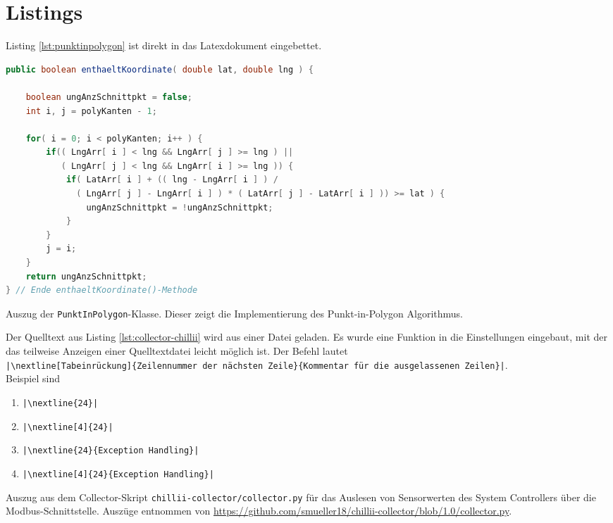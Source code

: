 \section{Listings}
\label{sec:listings}

Listing \ref{lst:punktinpolygon} ist direkt in das Latexdokument eingebettet.
\begin{code}
  \begin{lstlisting}[firstnumber=11,language=java]
public boolean enthaeltKoordinate( double lat, double lng ) {

    boolean ungAnzSchnittpkt = false;
    int i, j = polyKanten - 1;

    for( i = 0; i < polyKanten; i++ ) {
        if(( LngArr[ i ] < lng && LngArr[ j ] >= lng ) ||
           ( LngArr[ j ] < lng && LngArr[ i ] >= lng )) {
            if( LatArr[ i ] + (( lng - LngArr[ i ] ) /
              ( LngArr[ j ] - LngArr[ i ] ) * ( LatArr[ j ] - LatArr[ i ] )) >= lat ) {
                ungAnzSchnittpkt = !ungAnzSchnittpkt;
            }
        }
        j = i;
    }
    return ungAnzSchnittpkt;
} // Ende enthaeltKoordinate()-Methode
  \end{lstlisting}
  \caption[Auszug der PunktInPolygon-Klasse]{Auszug der \texttt{PunktInPolygon}-Klasse. Dieser zeigt die Implementierung des Punkt-in-Polygon Algorithmus.}
  \label{lst:punktinpolygon}
\end{code}


Der Quelltext aus Listing \ref{lst:collector-chillii} wird aus einer Datei geladen. Es wurde eine Funktion in die Einstellungen eingebaut, mit der das teilweise Anzeigen einer Quelltextdatei leicht möglich ist. Der Befehl lautet\\
\texttt{\scriptsize |\textbackslash nextline[Tabeinrückung]\{Zeilennummer der nächsten Zeile\}\{Kommentar für die ausgelassenen Zeilen\}|}.\\
Beispiel sind
\begin{enumerate} \footnotesize
  \item \texttt{|\textbackslash nextline\{24\}|}
  \item \texttt{|\textbackslash nextline[4]\{24\}|}
  \item \texttt{|\textbackslash nextline\{24\}\{Exception Handling\}|}
  \item \texttt{|\textbackslash nextline[4]\{24\}\{Exception Handling\}|}
\end{enumerate}




\begin{code}
  
  \caption[Collector-Skript für den System Controller]{Auszug aus dem Collector-Skript \texttt{chillii-collector/collector.py} für das Auslesen von Sensorwerten des System Controllers über die Modbus-Schnittstelle. Auszüge entnommen von \url{https://github.com/smueller18/chillii-collector/blob/1.0/collector.py}.}
  \label{lst:collector-chillii}
\end{code}
